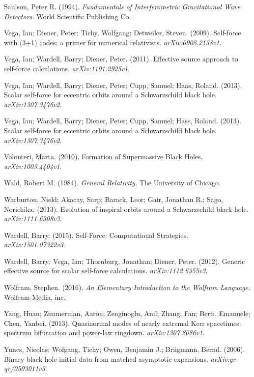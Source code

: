 Saulson, Peter R. (1994). {\em Fundamentals of Interferometric Gravitational Wave Detectors.} World Scientific Publishing Co.

Vega, Ian; Diener, Peter; Tichy, Wolfgang; Detweiler, Steven. (2009). Self-force with (3+1) codes: a primer for numerical relativists. {\em arXiv:0908.2138v1}.

Vega, Ian; Wardell, Barry; Diener, Peter. (2011). Effective source approach to self-force calculations. {\em arXiv:1101.2925v1}.

Vega, Ian; Wardell, Barry; Diener, Peter; Cupp, Samuel; Haas, Roland. (2013). Scalar self-force for eccentric orbits around a Schwarzschild black hole. {\em arXiv:1307.3476v2}.

Vega, Ian; Wardell, Barry; Diener, Peter; Cupp, Samuel; Hass, Roland. (2013). Scalar self-force for eccentric orbits around a Schwarzschild black hole. {\em arXiv:1307.3476v2}.

Volonteri, Marta. (2010). Formation of Supermassive Black Holes. {\em arXiv:1003.4404v1}.

Wald, Robert M. (1984). {\em General Relativity.} The University of Chicago.

Warburton, Nield; Akacay, Sarp; Barack, Leor; Gair, Jonathan R.; Sago, Norichika. (2013). Evolution of inspiral orbits around a Schwarzschild black hole. {\em arXiv:1111.6908v3}.

Wardell, Barry. (2015). Self-Force: Computational Strategies. {\em arXiv:1501.07322v3}.

Wardell, Barry; Vega, Ian; Thornburg, Jonathan; Diener, Peter. (2012). Generic effective source for scalar self-force calculations. {\em arXiv:1112.6355v3}.

Wolfram, Stephen. (2016). {\em An Elementary Introduction to the Wolfram Language.} Wolfram-Media, inc.

Yang, Huan; Zimmerman, Aaron; Zenginoglu, Anil; Zhang, Fan; Berti, Emanuele; Chen, Yanbei. (2013). Quasinormal modes of nearly extremal Kerr spacetimes: spectrum bifurcation and power-law ringdown. {\em arXiv:1307.8086v1}.

Yunes, Nicolas; Wofgang, Tichy; Owen, Benjamin J.; Briigmann, Bernd. (2006). Binary black hole initial data from matched asymptotic expansions. {\em arXiv:gr-qc/0503011v3}.

